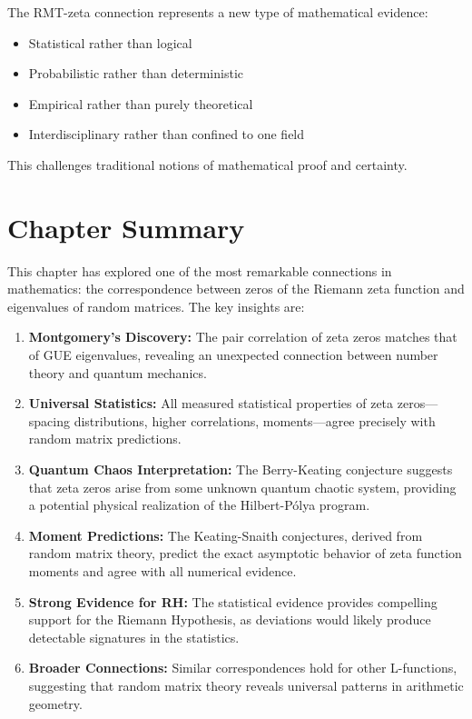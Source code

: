 \begin{remark}
The RMT-zeta connection represents a new type of mathematical evidence:
\begin{itemize}
\item Statistical rather than logical
\item Probabilistic rather than deterministic  
\item Empirical rather than purely theoretical
\item Interdisciplinary rather than confined to one field
\end{itemize}
This challenges traditional notions of mathematical proof and certainty.
\end{remark}

\section{Chapter Summary}
\label{sec:chapter_summary}

This chapter has explored one of the most remarkable connections in mathematics: the correspondence between zeros of the Riemann zeta function and eigenvalues of random matrices. The key insights are:

\begin{enumerate}
\item \textbf{Montgomery's Discovery:} The pair correlation of zeta zeros matches that of GUE eigenvalues, revealing an unexpected connection between number theory and quantum mechanics.

\item \textbf{Universal Statistics:} All measured statistical properties of zeta zeros—spacing distributions, higher correlations, moments—agree precisely with random matrix predictions.

\item \textbf{Quantum Chaos Interpretation:} The Berry-Keating conjecture suggests that zeta zeros arise from some unknown quantum chaotic system, providing a potential physical realization of the Hilbert-Pólya program.

\item \textbf{Moment Predictions:} The Keating-Snaith conjectures, derived from random matrix theory, predict the exact asymptotic behavior of zeta function moments and agree with all numerical evidence.

\item \textbf{Strong Evidence for RH:} The statistical evidence provides compelling support for the Riemann Hypothesis, as deviations would likely produce detectable signatures in the statistics.

\item \textbf{Broader Connections:} Similar correspondences hold for other L-functions, suggesting that random matrix theory reveals universal patterns in arithmetic geometry.
\end{enumerate}


